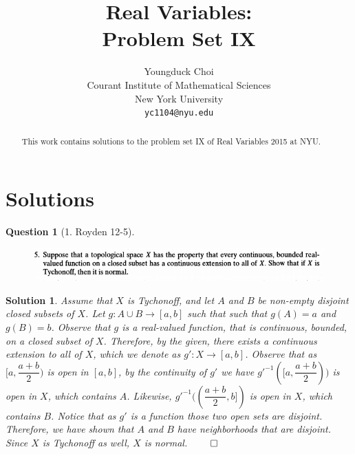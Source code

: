 \documentclass{article} %
\title{Real Variables: \\
Problem Set IX}
\author{
Youngduck Choi \\
Courant Institute of Mathematical Sciences \\
New York University \\
\texttt{yc1104@nyu.edu} \\
}
\theoremstyle{quest}
\newtheorem*{question}{Question}
\newtheorem*{solution}{Solution}
\begin{document}
\maketitle

\begin{abstract}
This work contains solutions to the problem set 
IX of Real Variables 2015 at NYU.
\end{abstract}

\section{Solutions}

\begin{question}[1. Royden 12-5]
\hfill
\begin{figure}[h!]
  \centering
    \includegraphics[width=1\textwidth]{12-5.png}
\end{figure}
\end{question}
\begin{solution}
Assume that $X$ is Tychonoff, and let $A$ and $B$ 
be non-empty disjoint closed subsets of 
$X$. Let $g:A \cup B \to [a,b]$ such that  
such that $g(A) = a$ and $g(B) = b$. Observe that $g$ is a real-valued
function, that is continuous, bounded, on a closed subset of $X$. 
Therefore, by the given, there exists a continuous extension to 
all of $X$, which we denote as $g':X \to [a,b]$. Observe that
as $[a,\dfrac{a+b}{2})$ is open in $[a,b]$, by the continuity of $g'$
we have $g'^{-1}([a,\dfrac{a+b}{2}))$ is open in $X$, which contains 
$A$. Likewise, $g'^{-1}((\dfrac{a+b}{2},b])$ is open in $X$, which contains
$B$. Notice that as $g'$ is a function those two open sets are disjoint.
Therefore, we have shown that $A$ and $B$ have neighborhoods that are 
disjoint. Since $X$ is Tychonoff as well, $X$ is normal. 
\hfill $\qed$
\end{solution}

\bigskip
\end{document}
